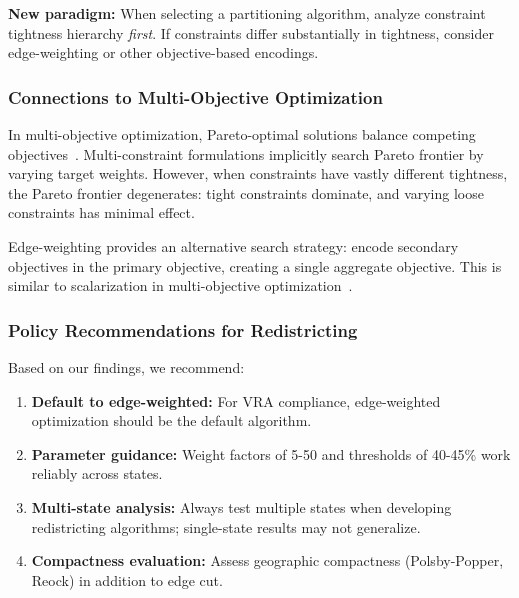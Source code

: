 \textbf{New paradigm:} When selecting a partitioning algorithm, analyze constraint tightness hierarchy \textit{first}. If constraints differ substantially in tightness, consider edge-weighting or other objective-based encodings.

\subsubsection{Connections to Multi-Objective Optimization}

In multi-objective optimization, Pareto-optimal solutions balance competing objectives~\cite{deb2001multi}. Multi-constraint formulations implicitly search Pareto frontier by varying target weights. However, when constraints have vastly different tightness, the Pareto frontier degenerates: tight constraints dominate, and varying loose constraints has minimal effect.

Edge-weighting provides an alternative search strategy: encode secondary objectives in the primary objective, creating a single aggregate objective. This is similar to scalarization in multi-objective optimization~\cite{marler2004survey}.

\subsubsection{Policy Recommendations for Redistricting}

Based on our findings, we recommend:
\begin{enumerate}
    \item \textbf{Default to edge-weighted:} For VRA compliance, edge-weighted optimization should be the default algorithm.
    \item \textbf{Parameter guidance:} Weight factors of 5-50 and thresholds of 40-45\% work reliably across states.
    \item \textbf{Multi-state analysis:} Always test multiple states when developing redistricting algorithms; single-state results may not generalize.
    \item \textbf{Compactness evaluation:} Assess geographic compactness (Polsby-Popper, Reock) in addition to edge cut.
\end{enumerate}
